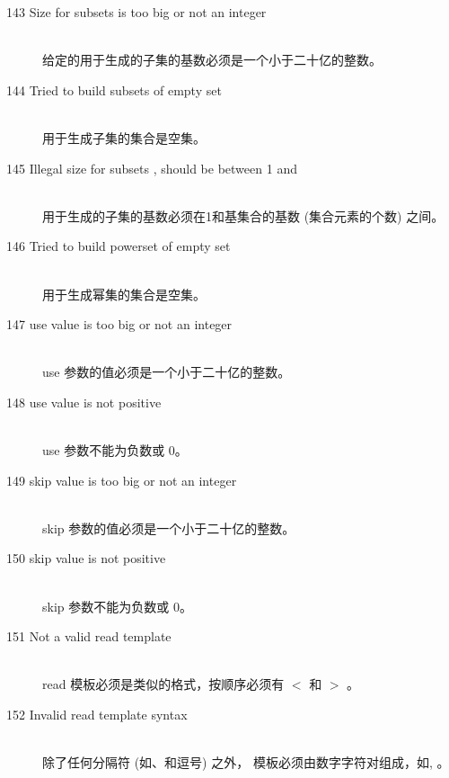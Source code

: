 \begin{description}
\item[143 Size for subsets  is too big or not an integer]\ \\
  给定的用于生成的子集的基数必须是一个小于二十亿的整数。
\item[144 Tried to build subsets of empty set]\ \\
  用于生成子集的集合是空集。
\item[145 Illegal size for subsets , should be between 1 
  and ]\ \\
  用于生成的子集的基数必须在1和基集合的基数 (集合元素的个数) 之间。
\item[146 Tried to build powerset of empty set ]\ \\
  用于生成幂集的集合是空集。
%
%
\item[147 use value  is too big or not an integer]\ \\
  use 参数的值必须是一个小于二十亿的整数。
\item[148 use value  is not positive]\ \\
  use 参数不能为负数或 0。
\item[149 skip value  is too big or not an integer]\ \\
  skip 参数的值必须是一个小于二十亿的整数。
\item[150 skip value  is not positive]\ \\
  skip 参数不能为负数或 0。
\item[151 Not a valid read template]\ \\
  read 模板必须是类似的格式，按顺序必须有 $<$ 和 $>$ 。
\item[152 Invalid read template syntax]\ \\
  除了任何分隔符 (如\code{$<$}、\code{$>$}和逗号) 之外，
  模板必须由数字字符对组成，如, 。

\end{description}
